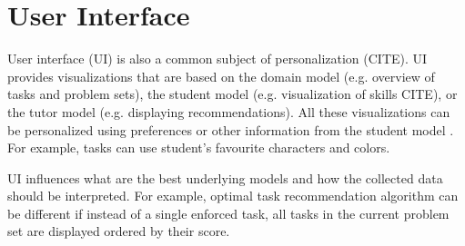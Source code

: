 %



\section{User Interface}
\label{sec:user-interface}

User interface (UI) is also a common subject of personalization (CITE).
UI provides visualizations that are based on
the domain model (e.g. overview of tasks and problem sets),
the student model (e.g. visualization of skills CITE),
or the tutor model (e.g. displaying recommendations).
All these visualizations can be personalized using
preferences or other information from the student model
\cite[chapter 9]{its-domain-models}.
For example,
tasks can use student's favourite characters and colors.

UI influences what are the best underlying models
and how the collected data should be interpreted.
For example, optimal task recommendation algorithm can be
different if instead of a single enforced task,
all tasks in the current problem set are displayed ordered by their score.

